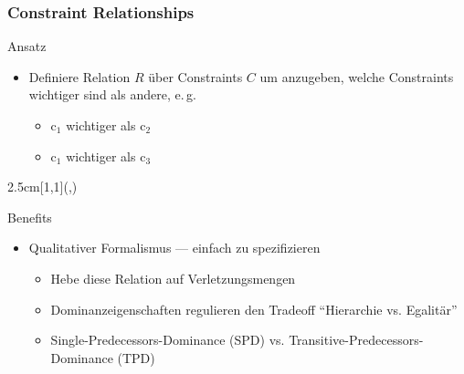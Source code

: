 \documentclass[10pt,xcolor={dvipsnames},fleqn]{beamer}
\newcommand{\cemph}[1]{\alert{#1}}
\begin{document}
\begin{frame}
\frametitle{Constraint Relationships}

Ansatz~\cite{Schiendorfer13}
\begin{itemize}
  \item Definiere Relation $R$ über Constraints $C$ um anzugeben, welche Constraints wichtiger sind als andere, e.\,g.
\begin{itemize}
  \item $\mathrm{c}_1$ wichtiger als $\mathrm{c}_2$

  \item $\mathrm{c}_1$ wichtiger als $\mathrm{c}_3$
\end{itemize}
\end{itemize}
\begin{textblock*}{2.5cm}[1,1](\textwidth-1.5cm,\textheight-4.03cm)
\end{textblock*}

\vspace*{5.6ex}

Benefits
\begin{itemize}
  \item \cemph{Qualitativer} Formalismus --- einfach zu spezifizieren
\begin{itemize}
 \item Hebe diese Relation auf Verletzungsmengen
  \item \cemph{Dominanzeigenschaften} regulieren den Tradeoff ``Hierarchie vs. Egalitär''
  \item Single-Predecessors-Dominance (SPD) vs. Transitive-Predecessors-Dominance (TPD)
\end{itemize}

\end{itemize}

\end{frame}
\end{document}
